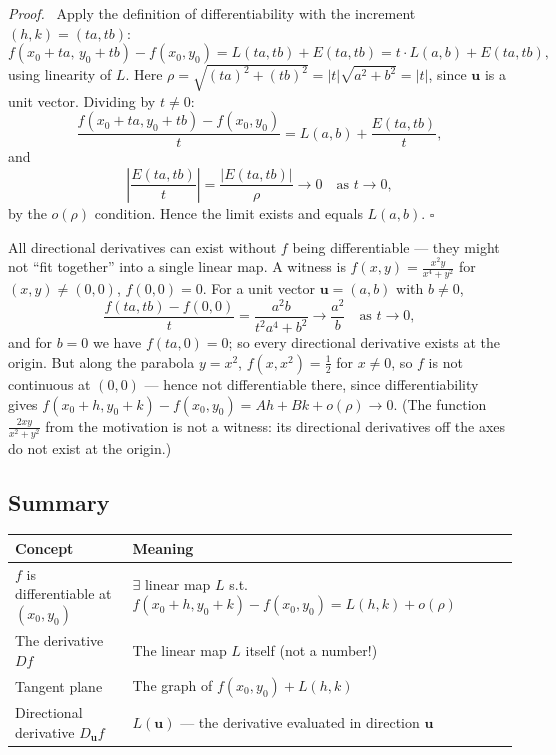 \documentclass[11pt]{report}
\renewenvironment{proof}[1][Proof]{\par\noindent\textit{#1.}\ }{\hfill$\square$\par\medskip}
\begin{document}
\begin{proof}
Apply the definition of differentiability with the increment $(h, k) = (ta, tb)$:
\[
f(x_0 + ta,\, y_0 + tb) - f(x_0, y_0) = L(ta, tb) + E(ta, tb) = t \cdot L(a, b) + E(ta, tb),
\]
using linearity of $L$. Here $\rho = \sqrt{(ta)^2 + (tb)^2} = |t|\sqrt{a^2 + b^2} = |t|$, since $\mathbf{u}$ is a unit vector. Dividing by $t \neq 0$:
\[
\frac{f(x_0 + ta, y_0 + tb) - f(x_0, y_0)}{t} = L(a, b) + \frac{E(ta, tb)}{t},
\]
and
\[
\left| \frac{E(ta, tb)}{t} \right| = \frac{|E(ta, tb)|}{\rho} \to 0 \quad \text{as } t \to 0,
\]
by the $o(\rho)$ condition. Hence the limit exists and equals $L(a, b)$.
\end{proof}

\begin{remark}
All directional derivatives can exist without $f$ being differentiable --- they might not ``fit together'' into a single linear map. A witness is $f(x,y) = \frac{x^2y}{x^4+y^2}$ for $(x,y) \neq (0,0)$, $f(0,0) = 0$. For a unit vector $\mathbf{u} = (a,b)$ with $b \neq 0$,
\[
\frac{f(ta,tb) - f(0,0)}{t} = \frac{a^2 b}{t^2a^4 + b^2} \to \frac{a^2}{b} \quad \text{as } t \to 0,
\]
and for $b = 0$ we have $f(ta, 0) = 0$; so every directional derivative exists at the origin. But along the parabola $y = x^2$, $f(x, x^2) = \tfrac12$ for $x \neq 0$, so $f$ is not continuous at $(0,0)$ --- hence not differentiable there, since differentiability gives $f(x_0+h, y_0+k) - f(x_0,y_0) = Ah + Bk + o(\rho) \to 0$. (The function $\frac{2xy}{x^2+y^2}$ from the motivation is not a witness: its directional derivatives off the axes do not exist at the origin.)
\end{remark}

\subsection*{Summary}

\begin{center}
\begin{tabular}{|l|l|}
\hline
\textbf{Concept} & \textbf{Meaning} \\
\hline
$f$ is differentiable at $(x_0, y_0)$ & $\exists$ linear map $L$ s.t.\ $f(x_0+h, y_0+k) - f(x_0, y_0) = L(h,k) + o(\rho)$ \\
\hline
The derivative $Df$ & The linear map $L$ itself (not a number!) \\
\hline
Tangent plane & The graph of $f(x_0, y_0) + L(h, k)$ \\
\hline
Directional derivative $D_{\mathbf{u}} f$ & $L(\mathbf{u})$ --- the derivative evaluated in direction $\mathbf{u}$ \\
\hline
\end{tabular}
\end{center}
\end{document}
